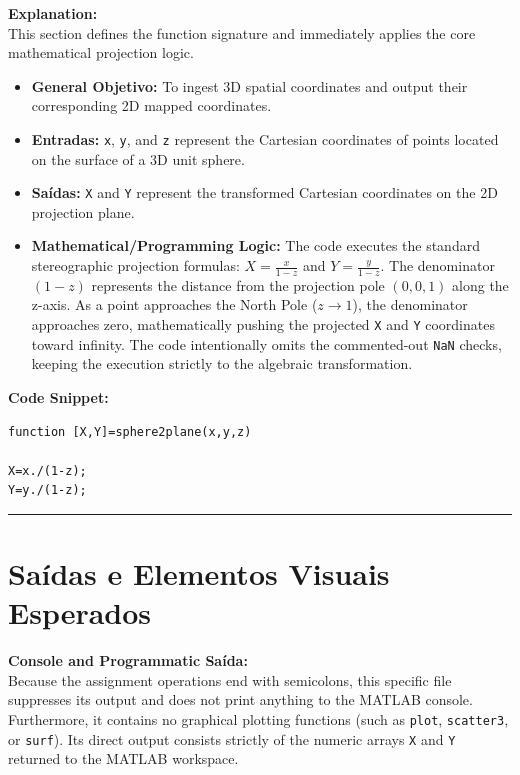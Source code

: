 \textbf{Explanation:}\\
This section defines the function signature and immediately applies the core mathematical projection logic. 
\begin{itemize}
    \item \textbf{General Objetivo:} To ingest 3D spatial coordinates and output their corresponding 2D mapped coordinates.
    \item \textbf{Entradas:} \texttt{x}, \texttt{y}, and \texttt{z} represent the Cartesian coordinates of points located on the surface of a 3D unit sphere.
    \item \textbf{Saídas:} \texttt{X} and \texttt{Y} represent the transformed Cartesian coordinates on the 2D projection plane.
    \item \textbf{Mathematical/Programming Logic:} The code executes the standard stereographic projection formulas: $X = \frac{x}{1-z}$ and $Y = \frac{y}{1-z}$. The denominator $(1-z)$ represents the distance from the projection pole $(0,0,1)$ along the z-axis. As a point approaches the North Pole ($z \to 1$), the denominator approaches zero, mathematically pushing the projected \texttt{X} and \texttt{Y} coordinates toward infinity. The code intentionally omits the commented-out \texttt{NaN} checks, keeping the execution strictly to the algebraic transformation.
\end{itemize}

\textbf{Code Snippet:}
\begin{lstlisting}
function [X,Y]=sphere2plane(x,y,z)

X=x./(1-z);
Y=y./(1-z);
\end{lstlisting}

\vspace{1em}
\hrule
\vspace{1em}

\section{Saídas e Elementos Visuais Esperados}

\textbf{Console and Programmatic Saída:}\\
Because the assignment operations end with semicolons, this specific file suppresses its output and does not print anything to the MATLAB console. Furthermore, it contains no graphical plotting functions (such as \texttt{plot}, \texttt{scatter3}, or \texttt{surf}). Its direct output consists strictly of the numeric arrays \texttt{X} and \texttt{Y} returned to the MATLAB workspace.


